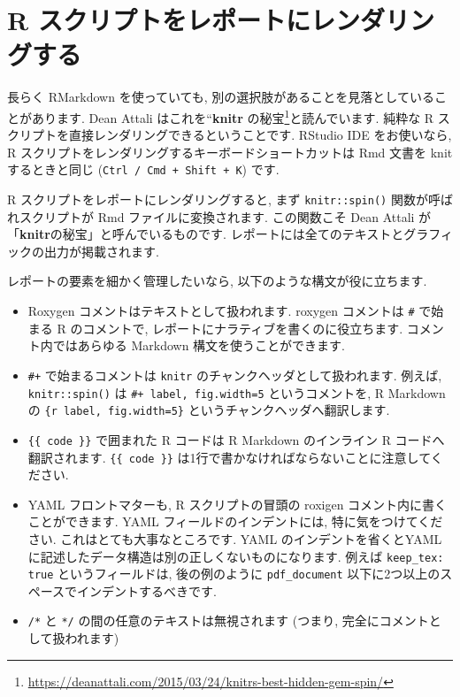 \documentclass[
  11pt,
  lualatex,ja=standard,jafont=noto]{bxjsreport}
\renewcommand{\href}[2]{#2\footnote{\url{#1}}}
\begin{document}
\hypertarget{spin}{%
\section{R スクリプトをレポートにレンダリングする}\label{spin}}

長らく RMarkdown を使っていても, 別の選択肢があることを見落としていることがあります. Dean Attali はこれを\href{https://deanattali.com/2015/03/24/knitrs-best-hidden-gem-spin/}{``\textbf{knitr} の秘宝}と読んでいます. 純粋な R スクリプトを直接レンダリングできるということです. RStudio IDE をお使いなら, R スクリプトをレンダリングするキーボードショートカットは Rmd 文書を knit するときと同じ (\texttt{Ctrl / Cmd + Shift + K}) です.

R スクリプトをレポートにレンダリングすると, まず \texttt{knitr::spin()} 関数が呼ばれスクリプトが Rmd ファイルに変換されます. この関数こそ Dean Attali が「\textbf{knitr}の秘宝」と呼んでいるものです. レポートには全てのテキストとグラフィックの出力が掲載されます.

レポートの要素を細かく管理したいなら, 以下のような構文が役に立ちます.

\begin{itemize}
\item
  Roxygen コメントはテキストとして扱われます. roxygen コメントは \texttt{\#\textquotesingle{}} で始まる R のコメントで, レポートにナラティブを書くのに役立ちます. コメント内ではあらゆる Markdown 構文を使うことができます.
\item
  \texttt{\#+} で始まるコメントは \texttt{knitr} のチャンクヘッダとして扱われます. 例えば, \texttt{knitr::spin()} は \texttt{\#+ label, fig.width=5} というコメントを, R Markdown の \texttt{\textasciigrave{}\textasciigrave{}\textasciigrave{}\{r\ label,\ fig.width=5\}} というチャンクヘッダへ翻訳します.
\item
  \texttt{\{\{ code \}\}} で囲まれた R コードは R Markdown のインライン R コードへ翻訳されます. \texttt{\{\{ code \}\}} は1行で書かなければならないことに注意してください.
\item
  YAML フロントマターも, R スクリプトの冒頭の roxigen コメント内に書くことができます. YAML フィールドのインデントには, 特に気をつけてください. これはとても大事なところです. YAML のインデントを省くとYAMLに記述したデータ構造は別の正しくないものになります. 例えば \texttt{keep\_tex: true} というフィールドは, 後の例のように \texttt{pdf\_document} 以下に2つ以上のスペースでインデントするべきです.
\item
  \texttt{/*} と \texttt{*/} の間の任意のテキストは無視されます (つまり, 完全にコメントとして扱われます)
\end{itemize}
\end{document}
